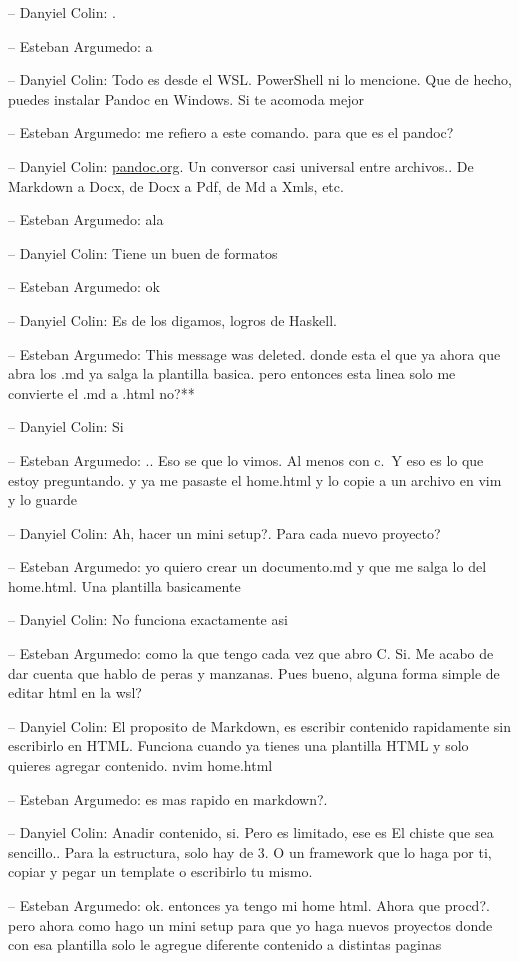 -- Danyiel Colin: .

-- Esteban Argumedo: a

-- Danyiel Colin: Todo es desde el WSL. PowerShell ni lo mencione. Que
de hecho, puedes instalar Pandoc en Windows. Si te acomoda mejor

-- Esteban Argumedo: me refiero a este comando. para que es el pandoc?

-- Danyiel Colin: \href{https://pandoc.org/installing.html}{pandoc.org}.
Un conversor casi universal entre archivos.. De Markdown a Docx, de Docx
a Pdf, de Md a Xmls, etc.

-- Esteban Argumedo: ala

-- Danyiel Colin: Tiene un buen de formatos

-- Esteban Argumedo: ok

-- Danyiel Colin: Es de los digamos, logros de Haskell.

-- Esteban Argumedo: This message was deleted. donde esta el que ya
ahora que abra los .md ya salga la plantilla basica. pero entonces esta
linea solo me convierte el .md a .html no?**

-- Danyiel Colin: Si

-- Esteban Argumedo: .. Eso se que lo vimos. Al menos con c.~Y eso es lo
que estoy preguntando. y ya me pasaste el home.html y lo copie a un
archivo en vim y lo guarde

-- Danyiel Colin: Ah, hacer un mini setup?. Para cada nuevo proyecto?

-- Esteban Argumedo: yo quiero crear un documento.md y que me salga lo
del home.html. Una plantilla basicamente

-- Danyiel Colin: No funciona exactamente asi

-- Esteban Argumedo: como la que tengo cada vez que abro C. Si. Me acabo
de dar cuenta que hablo de peras y manzanas. Pues bueno, alguna forma
simple de editar html en la wsl?

-- Danyiel Colin: El proposito de Markdown, es escribir contenido
rapidamente sin escribirlo en HTML. Funciona cuando ya tienes una
plantilla HTML y solo quieres agregar contenido. nvim home.html

-- Esteban Argumedo: es mas rapido en markdown?.

-- Danyiel Colin: Anadir contenido, si. Pero es limitado, ese es El
chiste que sea sencillo.. Para la estructura, solo hay de 3. O un
framework que lo haga por ti, copiar y pegar un template o escribirlo tu
mismo.

-- Esteban Argumedo: ok. entonces ya tengo mi home html. Ahora que
procd?. pero ahora como hago un mini setup para que yo haga nuevos
proyectos donde con esa plantilla solo le agregue diferente contenido a
distintas paginas

